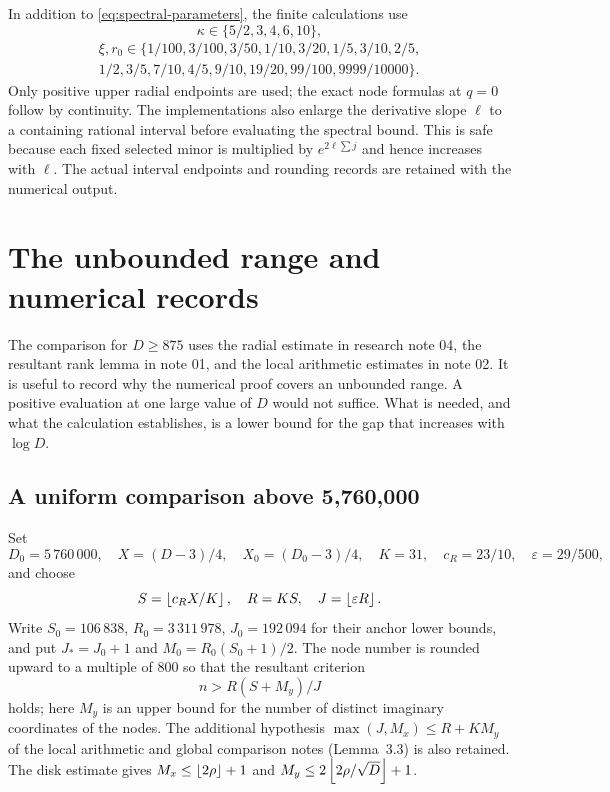 In addition to \eqref{eq:spectral-parameters}, the finite calculations use
\[
 \kappa\in\{5/2,3,4,6,10\},
\]
\begin{multline*}
 \xi,r_0\in\{1/100,3/100,3/50,1/10,3/20,1/5,3/10,2/5,\\
                     1/2,3/5,7/10,4/5,9/10,19/20,99/100,9999/10000\}.
\end{multline*}
Only positive upper radial endpoints are used; the exact node formulas at $q=0$ follow by continuity. The implementations also enlarge the derivative slope $\ell$ to a containing rational interval before evaluating the spectral bound. This is safe because each fixed selected minor is multiplied by $e^{2\ell\sum j}$ and hence increases with $\ell$. The actual interval endpoints and rounding records are retained with the numerical output.

\section{The unbounded range and numerical records}\label{app:global}
The comparison for $D\geq875$ uses the radial estimate in research note 04, the resultant rank lemma in note 01, and the local arithmetic estimates in note 02. It is useful to record why the numerical proof covers an unbounded range. A positive evaluation at one large value of $D$ would not suffice. What is needed, and what the calculation establishes, is a lower bound for the gap that increases with $\log D$.

\subsection{A uniform comparison above 5,760,000}
Set
\[
 D_0=5\,760\,000,\quad X=(D-3)/4,\quad X_0=(D_0-3)/4,
 \quad K=31,\quad c_R=23/10,\quad\varepsilon=29/500,
\]
and choose
\[
 S=\left\lfloor c_R X/K\right\rfloor,\quad R=KS,\quad J=\left\lfloor \varepsilon R\right\rfloor.
\]
Write $S_0=106\,838$, $R_0=3\,311\,978$, $J_0=192\,094$ for their anchor lower bounds, and put $J_* =J_0+1$ and $M_0=R_0(S_0+1)/2$. The node number is rounded upward to a multiple of $800$ so that the resultant criterion
\[
 n>R(S+M_y)/J
\]
holds; here $M_y$ is an upper bound for the number of distinct imaginary coordinates of the nodes. The additional hypothesis
$\max(J,M_x)\leq R+KM_y$ of the local arithmetic and global comparison notes (Lemma~3.3) is also retained. The disk estimate gives $M_x\leq\left\lfloor 2\rho\right\rfloor+1$ and $M_y\leq2\left\lfloor 2\rho/\sqrt D\right\rfloor+1$.

